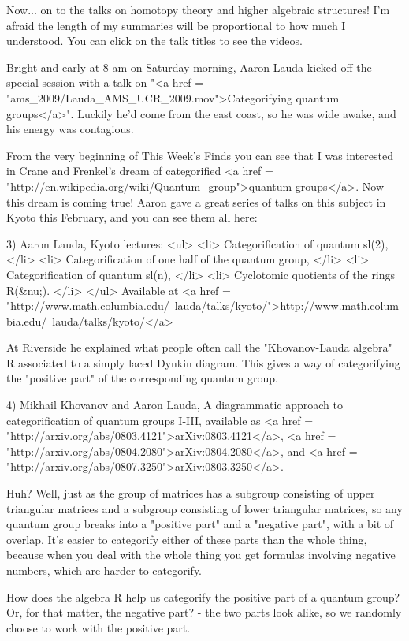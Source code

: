 Now... on to the talks on homotopy theory and higher algebraic
structures!  I'm afraid the length of my summaries will be
proportional to how much I understood.  You can click on the talk
titles to see the videos.

Bright and early at 8 am on Saturday morning, Aaron Lauda kicked off
the special session with a talk on "<a href =
"ams_2009/Lauda_AMS_UCR_2009.mov">Categorifying quantum
groups</a>".  Luckily he'd come from the east coast, so he was
wide awake, and his energy was contagious.

From the very beginning of This Week's Finds you can see that I was
interested in Crane and Frenkel's dream of categorified <a href =
"http://en.wikipedia.org/wiki/Quantum_group">quantum groups</a>.  Now
this dream is coming true!  Aaron gave a great series of talks on this
subject in Kyoto this February, and you can see them all here:

3) Aaron Lauda, Kyoto lectures: 
<ul>
<li>
Categorification of quantum sl(2),
</li>
<li>
Categorification of one half of the quantum group, 
</li>
<li>
Categorification of quantum sl(n),
</li>
<li>
Cyclotomic quotients of the rings R(&nu;).
</li>
</ul>
Available at <a href = "http://www.math.columbia.edu/~lauda/talks/kyoto/">http://www.math.columbia.edu/~lauda/talks/kyoto/</a>

At Riverside he explained what people often call the "Khovanov-Lauda
algebra" R associated to a simply laced Dynkin diagram.  This gives a
way of categorifying the "positive part" of the corresponding quantum
group.  

4) Mikhail Khovanov and Aaron Lauda, A diagrammatic approach to 
categorification of quantum groups I-III, available as
<a href = "http://arxiv.org/abs/0803.4121">arXiv:0803.4121</a>,
<a href = "http://arxiv.org/abs/0804.2080">arXiv:0804.2080</a>,
and
<a href = "http://arxiv.org/abs/0807.3250">arXiv:0803.3250</a>.

Huh?  Well, just as the group of matrices has a subgroup consisting of
upper triangular matrices and a subgroup consisting of lower
triangular matrices, so any quantum group breaks into a "positive
part" and a "negative part", with a bit of overlap.
It's easier to categorify either of these parts than the whole thing,
because when you deal with the whole thing you get formulas involving
negative numbers, which are harder to categorify.

How does the algebra R help us categorify the positive part of a
quantum group?  Or, for that matter, the negative part? - the two
parts look alike, so we randomly choose to work with the positive
part.  

